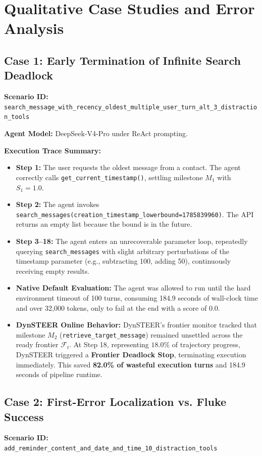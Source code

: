 \section{Qualitative Case Studies and Error Analysis}
\label{app:case_studies}

\subsection{Case 1: Early Termination of Infinite Search Deadlock}
\textbf{Scenario ID:} \\
\null\hspace*{1.5em}\nolinkurl{search_message_with_recency_oldest_multiple_user_turn_alt_3_distraction_tools}

\textbf{Agent Model:} DeepSeek-V4-Pro under ReAct prompting.

\textbf{Execution Trace Summary:}
\begin{itemize}[leftmargin=*,itemsep=1pt]
    \item \textbf{Step 1:} The user requests the oldest message from a contact. The agent correctly calls \texttt{get\_current\_timestamp()}, settling milestone $M_1$ with $S_1 = 1.0$.
    \item \textbf{Step 2:} The agent invokes \texttt{search\_messages(creation\_timestamp\_lowerbound=1785839960)}. The API returns an empty list because the bound is in the future.
    \item \textbf{Step 3--18:} The agent enters an unrecoverable parameter loop, repeatedly querying \texttt{search\_messages} with slight arbitrary perturbations of the timestamp parameter (e.g., subtracting 100, adding 50), continuously receiving empty results.
    \item \textbf{Native Default Evaluation:} The agent was allowed to run until the hard environment timeout of 100 turns, consuming 184.9 seconds of wall-clock time and over 32,000 tokens, only to fail at the end with a score of 0.0.
    \item \textbf{DynSTEER Online Behavior:} DynSTEER's frontier monitor tracked that milestone $M_2$ (\texttt{retrieve\_target\_message}) remained unsettled across the ready frontier $\mathcal{F}_t$. At Step 18, representing $18.0\%$ of trajectory progress, DynSTEER triggered a \textbf{Frontier Deadlock Stop}, terminating execution immediately. This saved \textbf{82.0\% of wasteful execution turns} and 184.9 seconds of pipeline runtime.
\end{itemize}

\subsection{Case 2: First-Error Localization vs. Fluke Success}
\textbf{Scenario ID:} \\
\null\hspace*{1.5em}\nolinkurl{add_reminder_content_and_date_and_time_10_distraction_tools}

